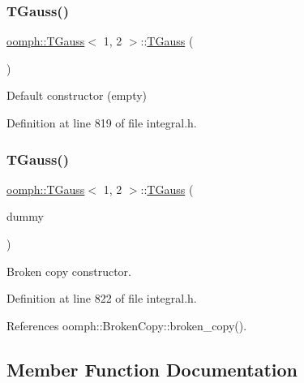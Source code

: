 \subsubsection{\texorpdfstring{T\+Gauss()}{TGauss()}\hspace{0.1cm}{\footnotesize\ttfamily [1/2]}}
{\footnotesize\ttfamily \hyperlink{classoomph_1_1TGauss}{oomph\+::\+T\+Gauss}$<$ 1, 2 $>$\+::\hyperlink{classoomph_1_1TGauss}{T\+Gauss} (\begin{DoxyParamCaption}{ }\end{DoxyParamCaption})\hspace{0.3cm}{\ttfamily [inline]}}



Default constructor (empty) 



Definition at line 819 of file integral.\+h.

\mbox{\label{classoomph_1_1TGauss_3_011_00_012_01_4_ad7bda225bb0287e1ac844daf765d3e8e}} 
\subsubsection{\texorpdfstring{T\+Gauss()}{TGauss()}\hspace{0.1cm}{\footnotesize\ttfamily [2/2]}}
{\footnotesize\ttfamily \hyperlink{classoomph_1_1TGauss}{oomph\+::\+T\+Gauss}$<$ 1, 2 $>$\+::\hyperlink{classoomph_1_1TGauss}{T\+Gauss} (\begin{DoxyParamCaption}\item[{const \hyperlink{classoomph_1_1TGauss}{T\+Gauss}$<$ 1, 2 $>$ \&}]{dummy }\end{DoxyParamCaption})\hspace{0.3cm}{\ttfamily [inline]}}



Broken copy constructor. 



Definition at line 822 of file integral.\+h.



References oomph\+::\+Broken\+Copy\+::broken\+\_\+copy().



\subsection{Member Function Documentation}
\mbox{\label{classoomph_1_1TGauss_3_011_00_012_01_4_a721d75aebbc1641c1170efaa66e1beab}} 
